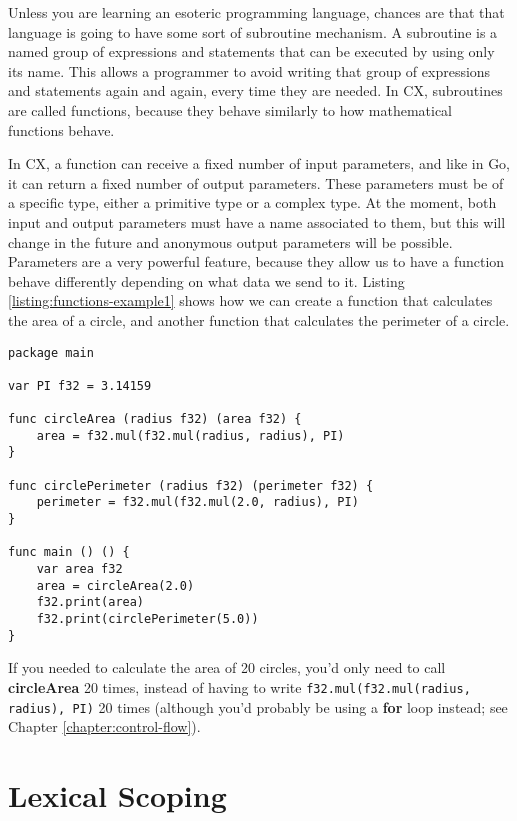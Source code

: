 \documentclass[11pt,fleqn,openany]{book} %
\begin{document}
Unless you are learning an esoteric programming language, chances are that that language is going to have some sort of subroutine mechanism. A subroutine is a named group of expressions and statements that can be executed by using only its name. This allows a programmer to avoid writing that group of expressions and statements again and again, every time they are needed. In CX, subroutines are called functions, because they behave similarly to how mathematical functions behave.

In CX, a function can receive a fixed number of input parameters, and like in Go, it can return a fixed number of output parameters. These parameters must be of a specific type, either a primitive type or a complex type. At the moment, both input and output parameters must have a name associated to them, but this will change in the future and anonymous output parameters will be possible. Parameters are a very powerful feature, because they allow us to have a function behave differently depending on what data we send to it. Listing \ref{listing:functions-example1} shows how we can create a function that calculates the area of a circle, and another function that calculates the perimeter of a circle.

\begin{lstlisting}[caption={Determining Area and Perimeter of a Circle using Functions},captionpos=b,label={listing:functions-example1}]
package main

var PI f32 = 3.14159

func circleArea (radius f32) (area f32) {
	area = f32.mul(f32.mul(radius, radius), PI)
}

func circlePerimeter (radius f32) (perimeter f32) {
	perimeter = f32.mul(f32.mul(2.0, radius), PI)
}

func main () () {
	var area f32
	area = circleArea(2.0)
	f32.print(area)
	f32.print(circlePerimeter(5.0))
}
\end{lstlisting}

If you needed to calculate the area of 20 circles, you'd only need to call \textbf{circleArea} 20 times, instead of having to write \lstinline{f32.mul(f32.mul(radius, radius), PI)} 20 times (although you'd probably be using a \textbf{for} loop instead; see Chapter \ref{chapter:control-flow}).

\section{Lexical Scoping}
\end{document}
